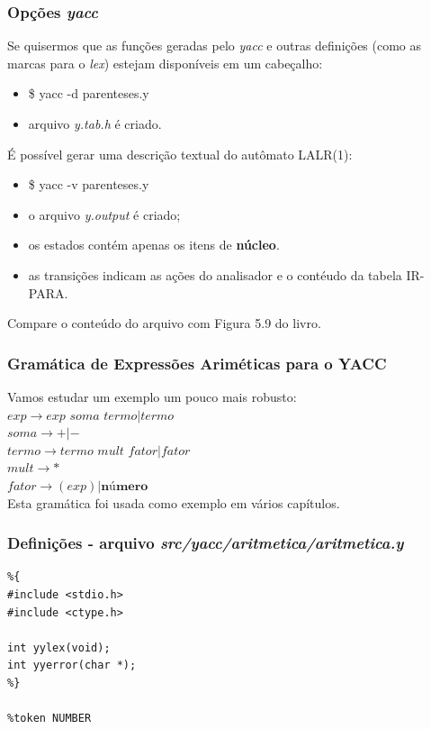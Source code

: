 \documentclass[table]{beamer}
\begin{document}
\begin{frame}
   \frametitle{Opções \textit{yacc}}
   Se quisermos que as funções geradas pelo \textit{yacc} e outras definições (como as marcas para o \textit{lex}) estejam disponíveis em um cabeçalho:
   \begin{itemize}
      \item \$ yacc -d parenteses.y
      \item arquivo \textit{y.tab.h} é criado.
   \end{itemize}
   É possível gerar uma descrição textual do autômato LALR(1):
   \begin{itemize}
      \item \$ yacc -v parenteses.y
      \item o arquivo \textit{y.output} é criado;
      \item os estados contém apenas os itens de \textbf{núcleo}.
      \item as transições indicam as ações do analisador e o contéudo da tabela IR-PARA.
   \end{itemize}
   Compare o conteúdo do arquivo com Figura 5.9 do livro. 
   
\end{frame}

\begin{frame}
   \frametitle{Gramática de Expressões Ariméticas para o YACC}
   Vamos estudar um exemplo um pouco mais robusto: \\
   $exp\to\textit{exp soma termo}|termo$ \\
   $soma\to+|-$ \\
   $termo\to\textit{termo mult fator}|fator$ \\
   $mult\to *$ \\
   $fator\to(exp)|\textbf{número}$\\
   Esta gramática foi usada como exemplo em vários capítulos. 
\end{frame}

\begin{frame}[fragile]
   \frametitle{Definições - arquivo \textit{src/yacc/aritmetica/aritmetica.y}}
   \begin{verbatim}
%{
#include <stdio.h>
#include <ctype.h>

int yylex(void);
int yyerror(char *);
%}

%token NUMBER
  \end{verbatim}
\end{frame}
\end{document}
